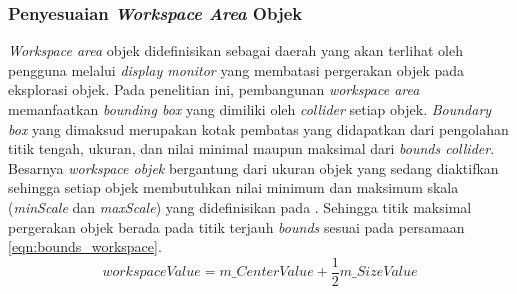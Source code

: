 		\subsubsection{Penyesuaian \textit{Workspace Area} Objek} \label{section:workspace}
		\vspace{0.5ex}
			\textit{Workspace area} objek didefinisikan sebagai daerah yang akan terlihat oleh pengguna melalui \textit{display monitor} yang membatasi pergerakan objek pada eksplorasi objek. Pada penelitian ini, pembangunan \textit{workspace area} memanfaatkan \textit{bounding box} yang dimiliki oleh \textit{collider} setiap objek. \textit{Boundary box} yang dimaksud merupakan kotak pembatas yang didapatkan dari pengolahan titik tengah, ukuran, dan nilai minimal maupun maksimal dari \textit{bounds collider}. %
			Besarnya \textit{workspace objek} bergantung dari ukuran objek yang sedang diaktifkan sehingga setiap objek membutuhkan nilai minimum dan maksimum skala (\textit{minScale} dan \textit{maxScale}) yang didefinisikan pada . Sehingga titik maksimal pergerakan objek berada pada titik terjauh \textit{bounds} sesuai pada persamaan \ref{eqn:bounds_workspace}.
			\begin{equation}
			workspaceValue = m\_CenterValue + \frac{1}{2} m\_SizeValue
			\label{eqn:bounds_workspace}
			\end{equation}
			

	\vspace{1.5ex}
		
